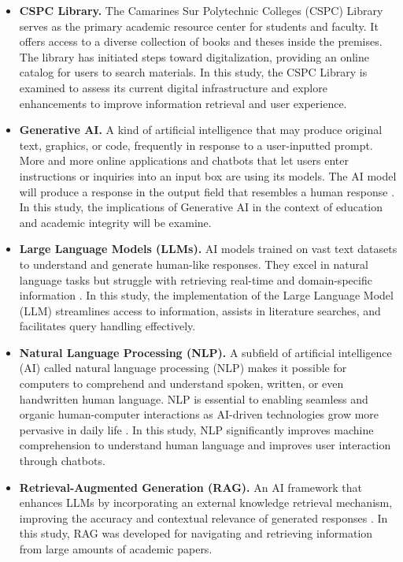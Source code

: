\begin{refsection}
\begin{itemize}
    \item \textbf{CSPC Library.} The Camarines Sur Polytechnic Colleges (CSPC) Library serves as the primary academic resource center for students and faculty. It offers access to a diverse collection of books and theses inside the premises. The library has initiated steps toward digitalization, providing an online catalog for users to search materials. In this study, the CSPC Library is examined to assess its current digital infrastructure and explore enhancements to improve information retrieval and user experience.

    \item \textbf{Generative AI.} A kind of artificial intelligence that may produce original text, graphics, or code, frequently in response to a user-inputted prompt. More and more online applications and chatbots that let users enter instructions or inquiries into an input box are using its models. The AI model will produce a response in the output field that resembles a human response \cite{bozkurt2024genai}. In this study, the implications of Generative AI in the context of education and academic integrity will be examine.

    \item \textbf{Large Language Models (LLMs).} AI models trained on vast text datasets to understand and generate human-like responses. They excel in natural language tasks but struggle with retrieving real-time and domain-specific information \cite{klang2024advancing}. In this study, the implementation of the Large Language Model (LLM) streamlines access to information, assists in literature searches, and facilitates query handling effectively.

    \item \textbf{Natural Language Processing (NLP).} A subfield of artificial intelligence (AI) called natural language processing (NLP) makes it possible for computers to comprehend and understand spoken, written, or even handwritten human language. NLP is essential to enabling seamless and organic human-computer interactions as AI-driven technologies grow more pervasive in daily life \cite{ramirez2024natural}. In this study, NLP significantly improves machine comprehension to understand human language and improves user interaction through chatbots.

    \item \textbf{Retrieval-Augmented Generation (RAG).} An AI framework that enhances LLMs by incorporating an external knowledge retrieval mechanism, improving the accuracy and contextual relevance of generated responses \cite{lewis2020retrieval}. In this study, RAG was developed for navigating and retrieving information from large amounts of academic papers.


\end{itemize}
\end{refsection}
